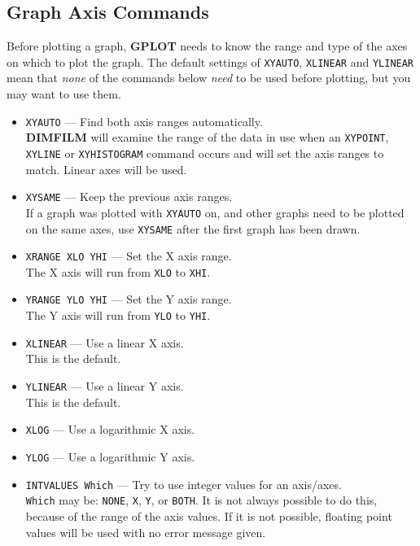 \documentclass[a4paper,twoside,11pt]{article}
\newcommand{\textttc}[1]{\texttt{\textcolor{OurRed}{#1}}}
\begin{document}
\subsection{Graph Axis Commands}
Before plotting a graph, \textbf{GPLOT} needs to know the range and type of the axes on which
to plot the graph. The default settings of \texttt{XYAUTO}, \texttt{XLINEAR} 
and \texttt{YLINEAR} mean that \textit{none}
of the commands below \textit{need} to be used before plotting, but you may want to use them. 
\begin{itemize}
\item \textttc{XYAUTO} --- Find both axis ranges automatically.\\
   \textbf{DIMFILM} will examine the range of the data in use when an \texttt{XYPOINT}, 
   \texttt{XYLINE} or \texttt{XYHISTOGRAM}
   command occurs and will set the axis ranges to match. Linear axes will be used.
\item \textttc{XYSAME} --- Keep the previous axis ranges.\\
   If a graph was plotted with \texttt{XYAUTO} on, and other graphs need to be plotted on the same
   axes, use \texttt{XYSAME} after the first graph has been drawn. 
\item \textttc{XRANGE XLO YHI} --- Set the X axis range.\\
   The X axis will run from \texttt{XLO} to \texttt{XHI}.
\item \textttc{YRANGE YLO YHI} --- Set the Y axis range.\\
   The Y axis will run from \texttt{YLO} to \texttt{YHI}.
\item \textttc{XLINEAR} --- Use a linear X axis.\\
   This is the default.
\item \textttc{YLINEAR} --- Use a linear Y axis.\\
   This is the default.
\item \textttc{XLOG} --- Use a logarithmic X axis.
\item \textttc{YLOG} --- Use a logarithmic Y axis.
\item \textttc{INTVALUES Which} --- Try to use integer values for an axis/axes.\\
  \texttt{Which} may be: \texttt{NONE}, \texttt{X}, \texttt{Y}, or \texttt{BOTH}.
  It is not always possible to do this, because of the range of the axis values. If
  it is not possible, floating point values will be used with no error message given.
\end{itemize}
\end{document}
